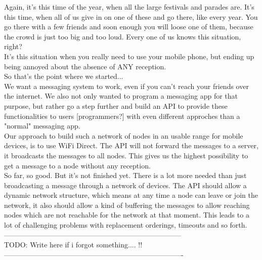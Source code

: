 Again, it's this time of the year, when all the large festivals and parades are. It's this time, when all of us give in on one of these and go there, like every year. 
You go there with a few friends and soon enough you will loose one of them, because the crowd is just too big and too loud. Every one of us knows this situation, right? \\
It's this situation when you really need to use your mobile phone, but ending up being annoyed about the absence of ANY reception. \\
So that's the point where we started... \\

We want a messaging system to work, even if you can't reach your friends over the internet. We also not only wanted to program a messaging app for that purpose, but rather go a step further and build an API to provide these functionalities to users [programmers?] with even different approches than a "normal" messaging app. \\

Our approach to build such a network of nodes in an usable range for mobile devices, is to use WiFi Direct. The API will not forward the messages to a server, it broadcasts the messages to all nodes. This gives us the highest possibility to get a message to a node without any reception. \\

So far, so good. But it's not finished yet. There is a lot more needed than just broadcasting a message through a network of devices. The API should allow a dynamic network structure, which means at any time a node can leave or join the network, it also should allow a kind of buffering the messages to allow reaching nodes which are not reachable for the network at that moment. This leads to a lot of challenging problems with replacement orderings, timeouts and so forth. \\

---------------------------------------------------------------------------\\
TODO: Write here if i forgot something.... !! \\

----------------------------------------------------------------------------